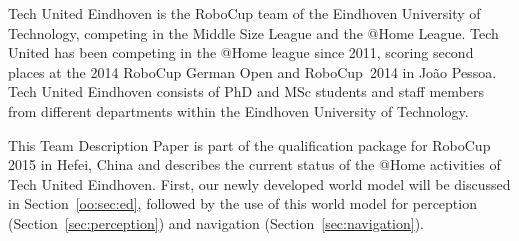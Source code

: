Tech United Eindhoven is the RoboCup team of the Eindhoven University of Technology, competing in the Middle Size League and the @Home League. Tech United has been competing in the @Home league since 2011, scoring second places at the 2014 RoboCup German Open and RoboCup~2014 in Jo\~{a}o Pessoa. 
Tech United Eindhoven consists of PhD and MSc students and staff members from different departments within the Eindhoven University of Technology.

This Team Description Paper is part of the qualification package for RoboCup 2015 in Hefei, China and describes the current status of the @Home activities of Tech United Eindhoven. First, our newly developed world model will be discussed in Section~\ref{oo:sec:ed}, followed by the use of this world model for perception (Section~\ref{sec:perception}) and navigation (Section~\ref{sec:navigation}).
